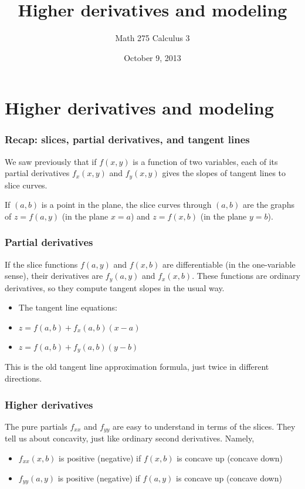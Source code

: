 \documentclass[11pt,ignorenonframetext,aspectratio=169,xcolor={svgnames}]{beamer}
\title{Higher derivatives and modeling}
\author{Math 275 Calculus 3}
\date{October 9, 2013}
\begin{document}
\frame{\titlepage}

\section{Higher derivatives and modeling}

\begin{frame}\frametitle{Recap: slices, partial derivatives, and tangent
lines}

We saw previously that if $f(x,y)$ is a function of two variables, each
of its partial derivatives $f_x(x,y)$ and $f_y(x,y)$ gives the slopes of
tangent lines to slice curves.

If $(a, b)$ is a point in the plane, the slice curves through $(a,b)$
are the graphs of $z = f(a, y)$ (in the plane $x = a$) and $z = f(x, b)$
(in the plane $y = b$).

\end{frame}

\begin{frame}\frametitle{Partial derivatives}

If the slice functions $f(a, y)$ and $f(x,b)$ are differentiable (in the
one-variable sense), their derivatives are $f_y(a,y)$ and $f_x(x,b)$.
These functions are ordinary derivatives, so they compute tangent slopes
in the usual way.

\begin{itemize}

\item
  The tangent line equations:
\item
  $z = f(a, b) + f_x(a,b)(x - a)$
\item
  $z = f(a, b) + f_y(a,b)(y - b)$
\end{itemize}

This is the old tangent line approximation formula, just twice in
different directions.

\end{frame}

\begin{frame}\frametitle{Higher derivatives}

The pure partials $f_{xx}$ and $f_{yy}$ are easy to understand in terms
of the slices. They tell us about concavity, just like ordinary second
derivatives. Namely,

\begin{itemize}

\item
  $f_{xx}(x,b)$ is positive (negative) if $f(x,b)$ is concave up
  (concave down)
\item
  $f_{yy}(a,y)$ is positive (negative) if $f(a,y)$ is concave up
  (concave down)
\end{itemize}

\end{frame}
\end{document}

